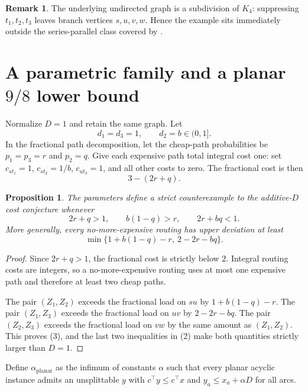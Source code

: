 \documentclass[11pt]{article}
\newtheorem{proposition}[theorem]{Proposition}
\theoremstyle{definition}
\newtheorem{remark}[theorem]{Remark}
\begin{document}
\begin{remark}
The underlying undirected graph is a subdivision of $K_4$: suppressing
$t_1,t_2,t_3$ leaves branch vertices $s,u,v,w$.  Hence the example sits
immediately outside the series-parallel class covered by
\citet{AlmoghrabiSkutellaWarode2026}.
\end{remark}

\section{A parametric family and a planar $9/8$ lower bound}

Normalize $D=1$ and retain the same graph.  Let
\[
 d_1=d_3=1,\qquad d_2=b\in(0,1].
\]
In the fractional path decomposition, let the cheap-path probabilities be
$p_1=p_3=r$ and $p_2=q$.  Give each expensive path total integral cost one:
set $c_{st_1}=1$, $c_{st_2}=1/b$, $c_{ut_3}=1$, and all other costs to zero.
The fractional cost is then
\[
 3-(2r+q).
\]

\begin{proposition}\label{prop:parametric}
The parameters define a strict counterexample to the additive-$D$ cost
conjecture whenever
\[
 2r+q>1,\qquad b(1-q)>r,\qquad 2r+bq<1.                 \tag{2}
\]
More generally, every no-more-expensive routing has upper deviation at least
\[
 \min\{1+b(1-q)-r,\ 2-2r-bq\}.                         \tag{3}
\]
\end{proposition}
\begin{proof}
Since $2r+q>1$, the fractional cost is strictly below $2$.  Integral routing
costs are integers, so a no-more-expensive routing uses at most one expensive
path and therefore at least two cheap paths.

The pair $(Z_1,Z_2)$ exceeds the fractional load on $su$ by
$1+b(1-q)-r$.  The pair $(Z_1,Z_3)$ exceeds the fractional load on $uv$ by
$2-2r-bq$.  The pair $(Z_2,Z_3)$ exceeds the fractional load on $vw$ by the
same amount as $(Z_1,Z_2)$.  This proves (3), and the last two inequalities in
(2) make both quantities strictly larger than $D=1$.
\end{proof}

Define $\alpha_{\mathrm{planar}}$ as the infimum of constants $\alpha$ such
that every planar acyclic instance admits an unsplittable $y$ with
$c^\top y\le c^\top x$ and $y_a\le x_a+\alpha D$ for all arcs.
\end{document}
